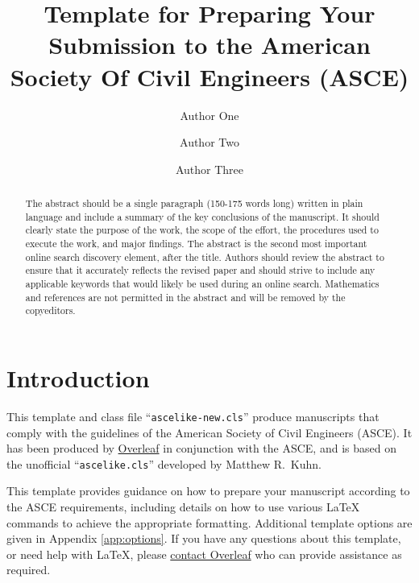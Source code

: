\documentclass[Journal,letterpaper]{ascelike-new}
\begin{document}
\title{Template for Preparing Your Submission to the American Society Of Civil Engineers (ASCE)}

\author[1]{Author One}
\author[2]{Author Two}
\author[3]{Author Three}


\maketitle

\begin{abstract}
The abstract should be a single paragraph (150-175 words long) written in plain language and include a summary of the key conclusions of the manuscript. It should clearly state the purpose of the work, the scope of the effort, the procedures used to execute the work, and major findings. The abstract is the second most important online search discovery element, after the title. Authors should review the abstract to ensure that it accurately reflects the revised paper and should strive to include any applicable keywords that would likely be used during an online search. Mathematics and references are not permitted in the abstract and will be removed by the copyeditors.
\end{abstract}

\section{Introduction}
This template and class file ``\texttt{ascelike-new.cls}'' produce manuscripts that comply with the guidelines of the American Society of Civil Engineers (ASCE). It has been produced by \href{https://www.overleaf.com}{Overleaf} in conjunction with the ASCE, and is based on the unofficial ``\texttt{ascelike.cls}'' developed by Matthew R.~Kuhn.

This template provides guidance on how to prepare your manuscript according to the ASCE requirements, including details on how to use various LaTeX commands to achieve the appropriate formatting. Additional template options are given in Appendix \ref{app:options}. If you have any questions about this template, or need help with LaTeX, please \href{https://www.overleaf.com/contact}{contact Overleaf} who can provide assistance as required.
\end{document}
